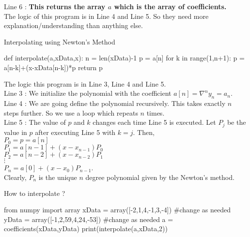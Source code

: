 \begin{commentary}
	Line 6 : \textbf{This returns the array $a$ which is the array of coefficients.}\\

	The logic of this program is in Line 4 and Line 5. So they need more explanation/understanding than anything else.
\end{commentary}

\begin{program}Interpolating using Newton's Method
	\begin{python}
		def interpolate(a,xData,x):
			n = len(xData)-1
			p = a[n]
			for k in range(1,n+1):
				p = a[n-k]+(x-xData[n-k])*p
			return p
	\end{python}
	The logic this program is in Line 3, Line 4 and Line 5.\\

	Line 3 : We initialize the polynomial with the coefficient $a[n] = \nabla^n y_n = a_n$.\\

	Line 4 : We are going define the polynomial recursively. This takes exactly $n$ steps further. So we use a loop which repeats $n$ times.\\

	Line 5 : The value of $p$ and $k$ changes each time Line 5 is executed. Let $P_j$ be the value in $p$ after executing Line 5 with $k=j$. Then,\\ $P_0 = p = a[n]$\\ $P_1 = a[n-1]+(x-x_{n-1})P_0$\\ $P_2 = a[n-2]+(x-x_{n-2})P_1$\\ $\vdots$\\ $P_n = a[0]+(x-x_0)P_{n-1}$.\\ Clearly, $P_n$ is the unique $n$ degree polynomial given by the Newton's method.
\end{program}

\begin{program}How to interpolate ?
	\begin{python}
		from numpy import array
		xData = array([-2,1,4,-1,3,-4]) #change as needed
		yData = array([-1,2,59,4,24,-53]) #change as needed
		a = coefficients(xData,yData)
		print(interpolate(a,xData,2))
	\end{python}
\end{program}

